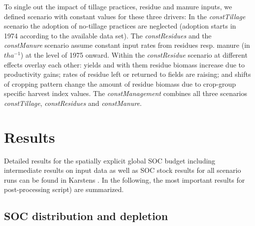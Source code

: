 \documentclass[gc, manuscript]{copernicus}
\begin{document}
To single out the impact of tillage practices, residue and manure inputs, we defined scenario with constant values for these three drivers: In the \textit{constTillage} scenario the adoption of no-tillage practices are neglected (adoption starts in 1974 according to the available data set). The \textit{constResidues} and the \textit{constManure} scenario assume constant input rates from residues resp. manure (in \(\unit{t ha^{-1}}\)) at the level of 1975 onward. Within the \textit{constResidue} scenario at different effects overlay each other: yields and with them residue biomass increase due to productivity gains; rates of residue left or returned to fields are raising; and shifts of cropping pattern change the amount of residue biomass due to crop-group specific harvest index values. The \textit{constManagement} combines all three scenarios \textit{constTillage}, \textit{constResidues} and \textit{constManure}.
\newpage

\hypertarget{results}{%
\section{Results}\label{results}}

Detailed results for the spatially explicit global SOC budget including intermediate results on input data as well as SOC stock results for all scenario runs can be found in Karstens \citeyearpar{karstens_model_2020}. In the following, the most important results \citep[see][]{karstens_result_2020} for post-processing script) are summarized.

\hypertarget{soc-distribution-and-depletion}{%
\subsection{SOC distribution and depletion}\label{soc-distribution-and-depletion}}
\end{document}
